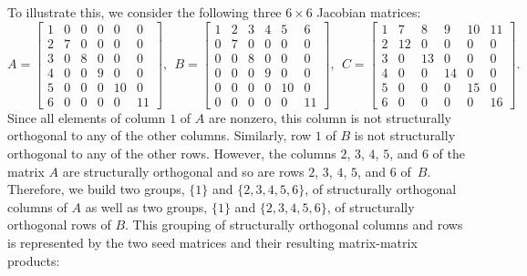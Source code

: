 \documentclass[12pt, oneside]{book}
\begin{document}
To illustrate this, we consider the following three $6 \times 6$ Jacobian matrices:
\begin{equation*}
A =
 \begin{bmatrix}
 1  & 0 & 0 & 0 & 0 & 0 \\
 2  & 7 & 0 & 0 & 0 & 0 \\
 3  & 0 & 8 & 0 & 0 & 0 \\
 4  & 0 & 0 & 9 & 0 & 0 \\
 5  & 0 & 0 & 0 & 10& 0 \\
 6  & 0 & 0 & 0 & 0 & 11
 \end{bmatrix}, \;\,
B =
 \begin{bmatrix}
 1  & 2 & 3 & 4 & 5 & 6 \\
 0  & 7 & 0 & 0 & 0 & 0 \\
 0  & 0 & 8 & 0 & 0 & 0 \\
 0  & 0 & 0 & 9 & 0 & 0 \\
 0  & 0 & 0 & 0 & 10& 0 \\
 0  & 0 & 0 & 0 & 0 & 11
 \end{bmatrix}, \;\,
 C =
  \begin{bmatrix}
 1  & 7  & 8  & 9  & 10 & 11 \\
 2  & 12 & 0  & 0  & 0  & 0 \\
 3  & 0  & 13 & 0  & 0  & 0 \\
 4  & 0  & 0  & 14 & 0  & 0 \\
 5  & 0  & 0  & 0  & 15 & 0 \\
 6  & 0  & 0  & 0  & 0  & 16
 \end{bmatrix}.
\end{equation*}
Since all elements of column $1$ of $A$ are nonzero, this column is not structurally
orthogonal to any of the other columns. Similarly, row $1$ of $B$ is not structurally
orthogonal to any of the other rows. However, the columns $2$, $3$, $4$, $5$, and $6$ of
the matrix $A$ are structurally orthogonal and so are rows $2$, $3$, $4$, $5$, and $6$
of~$B$. Therefore, we build two groups, $\{1 \}$ and $\{2, 3, 4, 5, 6\}$, of structurally
orthogonal columns of $A$ as well as two groups, $\{1 \}$ and $\{2, 3, 4, 5, 6\}$, of
structurally orthogonal rows of $B$. This grouping of structurally orthogonal columns and
rows is represented by the two seed matrices and their resulting matrix-matrix products:
\end{document}
